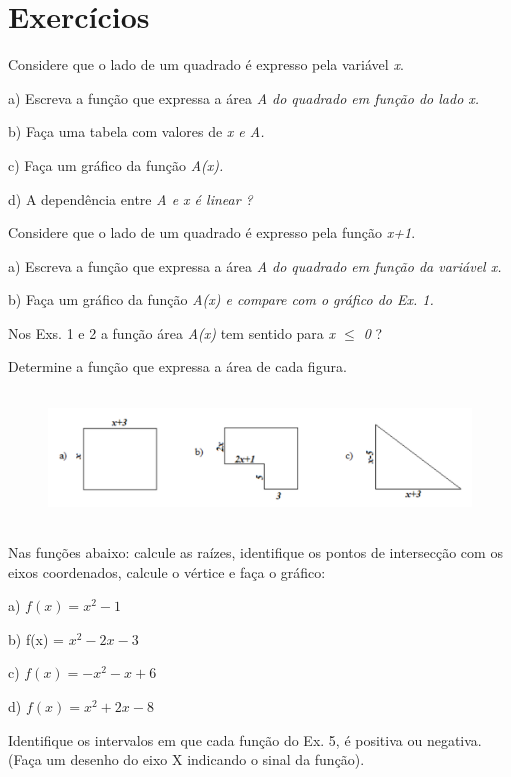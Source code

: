 \section{Exercícios}
\begin{enumerate}[label=\thechapter.\arabic*]
\exitem{} Considere que o lado de um quadrado é expresso pela variável \textit{x}.

a) Escreva a função que expressa a área \textit{A do quadrado em função do lado x.}

b) Faça uma tabela com valores de \textit{x e A.}

c) Faça um gráfico da função \textit{A(x).}

d) A dependência entre \textit{A e x é linear ? }

\exitem{} Considere que o lado de um quadrado é expresso pela função \textit{x+1}.

a) Escreva a função que expressa a área \textit{A do quadrado em função da variável x.}

b) Faça um gráfico da função \textit{A(x) e compare com o gráfico do Ex. 1.}

\exitem{} Nos Exs. 1 e 2 a função área \textit{A(x)} tem sentido para \textit{x $ \leq $  0} ?

\exitem{} Determine a função que expressa a área de cada figura.

\begin{figure}[H]
	\begin{Center}
		\includegraphics[width=5.91in,height=1.39in]{capitulos/funcao_do_segundo_grau/media/image24.pdf}
	\end{Center}
\end{figure}

\exitem{} Nas funções abaixo: calcule as raízes, identifique os pontos de intersecção com os eixos coordenados, calcule o vértice e faça o gráfico:

a) $f(x) = x^2 - 1$

b) f(x) = $x^2 -2x - 3$

c) $f(x) =- x^2 - x + 6$

d) $f(x) = x^2 + 2x - 8$

\exitem{} Identifique os intervalos em que cada função do Ex. 5, é positiva ou negativa. (Faça um desenho do eixo X indicando o sinal da função).


\end{enumerate}
